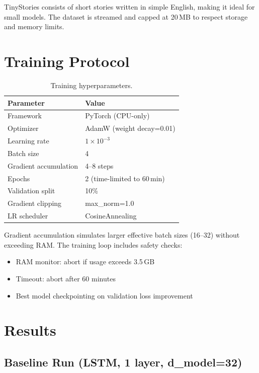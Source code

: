 \documentclass[11pt,a4paper]{article}
\begin{document}
TinyStories consists of short stories written in simple English, making it ideal for small models. The dataset is streamed and capped at 20\,MB to respect storage and memory limits.

\section{Training Protocol}

\begin{table}[h]
\centering
\begin{tabular}{@{}ll@{}}
\toprule
\textbf{Parameter} & \textbf{Value} \\
\midrule
Framework & PyTorch (CPU-only) \\
Optimizer & AdamW (weight decay=0.01) \\
Learning rate & $1 \times 10^{-3}$ \\
Batch size & 4 \\
Gradient accumulation & 4--8 steps \\
Epochs & 2 (time-limited to 60\,min) \\
Validation split & 10\% \\
Gradient clipping & max\_norm=1.0 \\
LR scheduler & CosineAnnealing \\
\bottomrule
\end{tabular}
\caption{Training hyperparameters.}
\end{table}

Gradient accumulation simulates larger effective batch sizes (16--32) without exceeding RAM. The training loop includes safety checks:
\begin{itemize}[nosep]
  \item RAM monitor: abort if usage exceeds 3.5\,GB
  \item Timeout: abort after 60 minutes
  \item Best model checkpointing on validation loss improvement
\end{itemize}

\section{Results}

\subsection{Baseline Run (LSTM, 1 layer, d\_model=32)}
\end{document}

